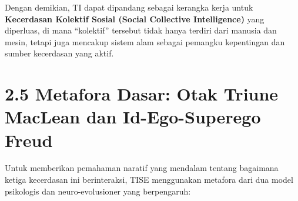 \documentclass[
  letterpaper,
  DIV=11,
  numbers=noendperiod]{scrreprt}
\begin{document}
Dengan demikian, TI dapat dipandang sebagai kerangka kerja untuk
\textbf{Kecerdasan Kolektif Sosial (Social Collective Intelligence)}
yang diperluas, di mana ``kolektif'' tersebut tidak hanya terdiri dari
manusia dan mesin, tetapi juga mencakup sistem alam sebagai pemangku
kepentingan dan sumber kecerdasan yang aktif.

\section{\texorpdfstring{\textbf{2.5 Metafora Dasar: Otak Triune MacLean
dan Id-Ego-Superego
Freud}}{2.5 Metafora Dasar: Otak Triune MacLean dan Id-Ego-Superego Freud}}\label{metafora-dasar-otak-triune-maclean-dan-id-ego-superego-freud}

Untuk memberikan pemahaman naratif yang mendalam tentang bagaimana
ketiga kecerdasan ini berinteraksi, TISE menggunakan metafora dari dua
model psikologis dan neuro-evolusioner yang berpengaruh:
\end{document}
